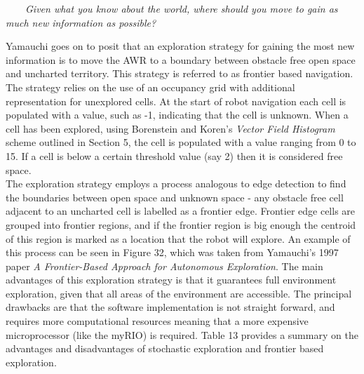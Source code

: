 \documentclass[a4paper]{article}
\begin{document}
\vspace{0.5cm}

 \ \ \ \ \textit{Given what you know about the world, where should you move to gain as much new information as possible?}

\vspace{0.5cm}

Yamauchi goes on to posit that an exploration strategy for gaining the most new information is to move the AWR to a boundary between obstacle free open space and uncharted territory. This strategy is referred to as frontier based navigation. The strategy relies on the use of an occupancy grid with additional representation for unexplored cells. At the start of robot navigation each cell is populated with a value, such as -1, indicating that the cell is unknown. When a cell has been explored, using Borenstein and Koren's \textit{Vector Field Histogram} scheme outlined in Section 5, the cell is populated with a value ranging from 0 to 15. If a cell is below a certain threshold value (say 2) then it is considered free space.\\

The exploration strategy employs a process analogous to edge detection to find the boundaries between open space and unknown space - any obstacle free cell adjacent to an uncharted cell is labelled as a frontier edge. Frontier edge cells are grouped into frontier regions, and if the frontier region is big enough the centroid of this region is marked as a location that the robot will explore. An example of this process can be seen in Figure 32, which was taken from Yamauchi's 1997 paper \textit{A Frontier-Based Approach for Autonomous Exploration}. The main advantages of this exploration strategy is that it guarantees full environment exploration, given that all areas of the environment are accessible. The principal drawbacks are that the software implementation is not straight forward, and requires more computational resources meaning that a more expensive microprocessor (like the myRIO) is required. Table 13 provides a summary on the advantages and disadvantages of stochastic exploration and frontier based exploration.
\end{document}
